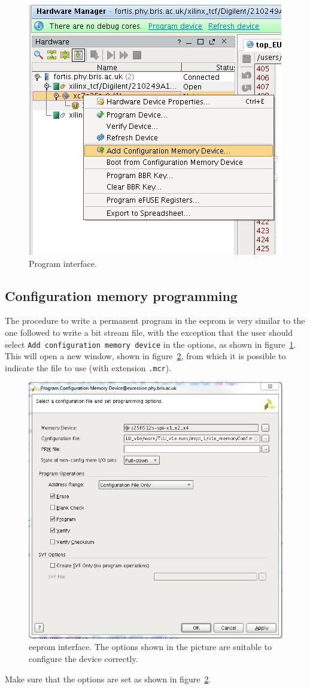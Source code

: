 \begin{figure}
  \centering
  \includegraphics[width=.80\textwidth]{./Images/AddMemory.png}
  \caption{Program interface.}\label{fig:hw_addMemory}
\end{figure}
 
\subsection{Configuration memory programming}
The procedure to write a permanent program in the \gls{eeprom} is very similar to the one followed to write a bit stream file, with the exception that the user should select \verb"Add configuration memory device" in the options, as shown in figure~\ref{fig:hw_addMemory}.
This will open a new window, shown in figure~\ref{fig:hw_eeprom}, from which it is possible to indicate the file to use (with extension \verb".mcr").
\begin{figure}
  \centering
  \includegraphics[width=.80\textwidth]{./Images/hw_prog.png}
  \caption{\gls{eeprom} interface. The options shown in the picture are suitable to configure the device correctly.}
  \label{fig:hw_eeprom}
\end{figure}
Make sure that the options are set as shown in figure~\ref{fig:hw_eeprom}.

